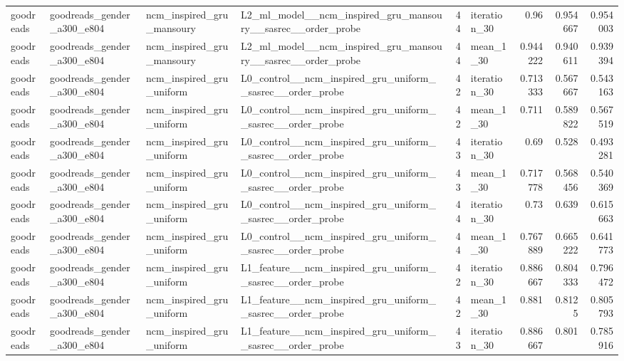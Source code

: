 \begin{table}[htbp!]
\begin{tabular}{llllrlrrr}
goodreads & goodreads\_gender\_a300\_e804 & ncm\_inspired\_gru\_mansoury & L2\_ml\_model\_\_ncm\_inspired\_gru\_mansoury\_\_sasrec\_\_order\_probe & 44 & iteration\_30 & 0.96 & 0.954667 & 0.954003 \\
goodreads & goodreads\_gender\_a300\_e804 & ncm\_inspired\_gru\_mansoury & L2\_ml\_model\_\_ncm\_inspired\_gru\_mansoury\_\_sasrec\_\_order\_probe & 44 & mean\_1\_30 & 0.944222 & 0.940611 & 0.939394 \\
goodreads & goodreads\_gender\_a300\_e804 & ncm\_inspired\_gru\_uniform & L0\_control\_\_ncm\_inspired\_gru\_uniform\_\_sasrec\_\_order\_probe & 42 & iteration\_30 & 0.713333 & 0.567667 & 0.543163 \\
goodreads & goodreads\_gender\_a300\_e804 & ncm\_inspired\_gru\_uniform & L0\_control\_\_ncm\_inspired\_gru\_uniform\_\_sasrec\_\_order\_probe & 42 & mean\_1\_30 & 0.711 & 0.589822 & 0.567519 \\
goodreads & goodreads\_gender\_a300\_e804 & ncm\_inspired\_gru\_uniform & L0\_control\_\_ncm\_inspired\_gru\_uniform\_\_sasrec\_\_order\_probe & 43 & iteration\_30 & 0.69 & 0.528 & 0.493281 \\
goodreads & goodreads\_gender\_a300\_e804 & ncm\_inspired\_gru\_uniform & L0\_control\_\_ncm\_inspired\_gru\_uniform\_\_sasrec\_\_order\_probe & 43 & mean\_1\_30 & 0.717778 & 0.568456 & 0.540369 \\
goodreads & goodreads\_gender\_a300\_e804 & ncm\_inspired\_gru\_uniform & L0\_control\_\_ncm\_inspired\_gru\_uniform\_\_sasrec\_\_order\_probe & 44 & iteration\_30 & 0.73 & 0.639 & 0.615663 \\
goodreads & goodreads\_gender\_a300\_e804 & ncm\_inspired\_gru\_uniform & L0\_control\_\_ncm\_inspired\_gru\_uniform\_\_sasrec\_\_order\_probe & 44 & mean\_1\_30 & 0.767889 & 0.665222 & 0.641773 \\
goodreads & goodreads\_gender\_a300\_e804 & ncm\_inspired\_gru\_uniform & L1\_feature\_\_ncm\_inspired\_gru\_uniform\_\_sasrec\_\_order\_probe & 42 & iteration\_30 & 0.886667 & 0.804333 & 0.796472 \\
goodreads & goodreads\_gender\_a300\_e804 & ncm\_inspired\_gru\_uniform & L1\_feature\_\_ncm\_inspired\_gru\_uniform\_\_sasrec\_\_order\_probe & 42 & mean\_1\_30 & 0.881 & 0.8125 & 0.805793 \\
goodreads & goodreads\_gender\_a300\_e804 & ncm\_inspired\_gru\_uniform & L1\_feature\_\_ncm\_inspired\_gru\_uniform\_\_sasrec\_\_order\_probe & 43 & iteration\_30 & 0.886667 & 0.801 & 0.785916 \\

\end{tabular}
\end{table}
